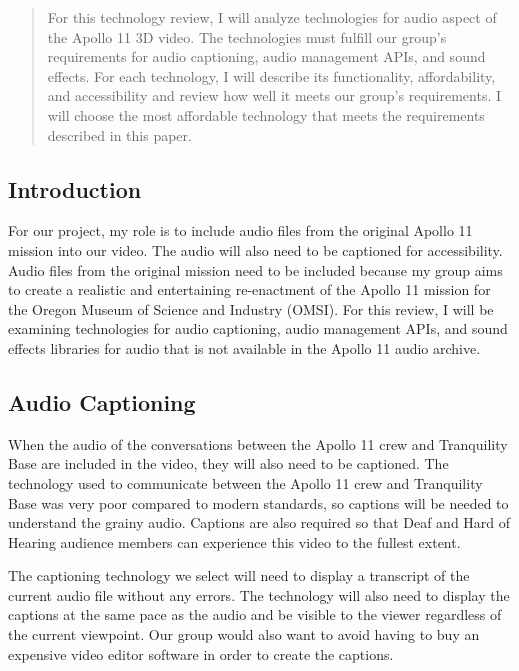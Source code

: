 \documentclass[onecolumn, draftclsnofoot,10pt, compsoc]{IEEEtran}
\begin{document}
\begin{titlepage}
\begin{singlespace}
{{            }
            \vspace{20pt}
        }
        \begin{abstract}
        	For this technology review, I will analyze technologies for audio aspect of the Apollo 11 3D video. The technologies must fulfill our group's requirements for audio captioning, audio management APIs, and sound effects. For each technology, I will describe its functionality, affordability, and accessibility and review how well it meets our group's requirements. I will choose the most affordable technology that meets the requirements described in this paper.
        \end{abstract}     
    \end{singlespace}
\end{titlepage}
\newpage
{}

\subsection{Introduction}
For our project, my role is to include audio files from the original Apollo 11 mission into our video. The audio will also need to be captioned for accessibility. Audio files from the original mission need to be included because my group aims to create a realistic and entertaining re-enactment of the Apollo 11 mission for the Oregon Museum of Science and Industry (OMSI). For this review, I will be examining technologies for audio captioning, audio management APIs, and sound effects libraries for audio that is not available in the Apollo 11 audio archive.

\subsection{Audio Captioning}
When the audio of the conversations between the Apollo 11 crew and Tranquility Base are included in the video, they will also need to be captioned. The technology used to communicate between the Apollo 11 crew and Tranquility Base was very poor compared to modern standards, so captions will be needed to understand the grainy audio. Captions are also required so that Deaf and Hard of Hearing audience members can experience this video to the fullest extent.

The captioning technology we select will need to display a transcript of the current audio file without any errors. The technology will also need to display the captions at the same pace as the audio and be visible to the viewer regardless of the current viewpoint. Our group would also want to avoid having to buy an expensive video editor software in order to create the captions.
\end{document}
